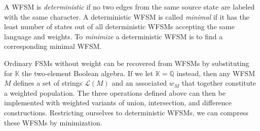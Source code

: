 \documentclass{llncs}
\begin{document}
A WFSM is \emph{deterministic} if no two edges from the same source
state are labeled with the same character.
A deterministic WFSM is called \emph{minimal} if it has the least
number of states out of all deterministic WFSMs accepting the same
language and weights.
To \emph{minimize} a deterministic WFSM is to find a corresponding minimal WFSM. %

Ordinary FSMs without weight can be recovered from WFSMs by
substituting for $\mathbb{K}$ the two-element Boolean algebra.
If we let $\mathbb{K}=\mathbb{Q}$ instead,
then any WFSM $M$ defines a set of strings $\mathcal{L}(M)$ and an
associated $w_M$ that together constitute a weighted population.
The three operations defined above can then be implemented with
weighted variants of union, intersection, and difference constructions.
Restricting ourselves to deterministic WFSMs,
we can compress these WFSMs by minimization.





\end{document}
